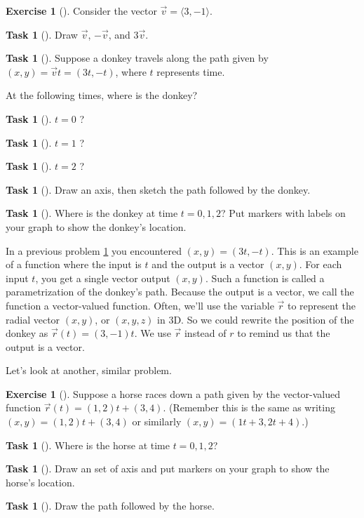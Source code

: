 \documentclass[10pt,]{book}
\theoremstyle{plain}
\theoremstyle{definition}
\theoremstyle{definition}
\theoremstyle{definition}
\theoremstyle{definition}
\newtheorem{exploration}[project]{Exercise}
\newtheorem{task}[project]{Task}
\theoremstyle{definition}
\numberwithin{equation}{section}
\begin{document}
\begin{exploration}[]\label{prob_donkey}
Consider the vector \(\vec v=\langle 3,-1 \rangle\).%
\begin{task}[]\label{task-33}
Draw \(\vec v\), \(-\vec v\), and \(3\vec v\).%
\end{task}
\begin{task}[]\label{task-34}
Suppose a donkey travels along the path given by \((x,y)=\vec v t = (3t,-t)\), where \(t\) represents time.%
\par
At the following times, where is the donkey?%
\begin{task}[]\label{task-35}
\(t=0\) ?%
\end{task}
\begin{task}[]\label{task-36}
\(t=1\) ?%
\end{task}
\begin{task}[]\label{task-37}
\(t=2\) ?%
\end{task}
\end{task}
\begin{task}[]\label{task-38}
Draw an axis, then sketch the path followed by the donkey.%
\end{task}
\begin{task}[]\label{task-39}
Where is the donkey at time \(t=0,1,2\)? Put markers with labels on your graph to show the donkey's location.%
\end{task}
\end{exploration}
In a previous problem \hyperref[prob_donkey]{\ref{prob_donkey}} you encountered \((x,y)=(3t,-t)\). This is an example of a function where the input is \(t\) and the output is a vector \((x,y)\). For each input \(t\), you get a single vector output \((x,y)\). Such a function is called a parametrization of the donkey's path. Because the output is a vector, we call the function a vector-valued function. Often, we'll use the variable \(\vec r\) to represent the radial vector \((x,y)\), or \((x,y,z)\) in 3D. So we could rewrite the position of the donkey as \(\vec r(t)=(3,-1)t\). We use \(\vec r\) instead of \(r\) to remind us that the output is a vector.%
\par
Let's look at another, similar problem.%
\begin{exploration}[]\label{prob_horseline}
Suppose a horse races down a path given by the vector-valued function \(\vec r(t) = (1,2)t+(3,4)\). (Remember this is the same as writing \((x,y) =  (1,2)t+(3,4)\) or similarly \((x,y)=(1t+3,2t+4)\).)%
\begin{task}[]\label{task-40}
Where is the horse at time \(t=0,1,2\)?%
\end{task}
\begin{task}[]\label{task-41}
Draw an set of axis and put markers on your graph to show the horse's location.%
\end{task}
\begin{task}[]\label{task-42}
Draw the path followed by the horse.%
\end{task}
\end{exploration}
\end{document}
